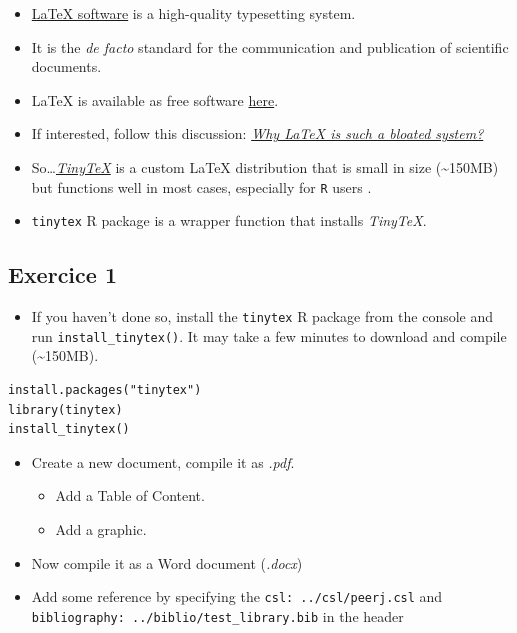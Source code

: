\documentclass[]{article}
\providecommand{\tightlist}{%
  \setlength{\itemsep}{0pt}\setlength{\parskip}{0pt}}
\begin{document}
\begin{itemize}
\item
  \href{https://www.latex-project.org}{LaTeX software} is a high-quality
  typesetting system.
\item
  It is the \emph{de facto} standard for the communication and
  publication of scientific documents.
\item
  LaTeX is available as free software
  \href{https://www.latex-project.org/get/}{here}.
\item
  If interested, follow this discussion:
  \href{https://ubuntuforums.org/showthread.php?t=395863}{\emph{Why
  LaTeX is such a bloated system?}}
\item
  So\ldots{}\href{https://yihui.name/tinytex/r/}{\emph{TinyTeX}} is a
  custom LaTeX distribution that is small in size
  (\textasciitilde{}150MB) but functions well in most cases, especially
  for \texttt{R} users .
\item
  \texttt{tinytex} R package is a wrapper function that installs
  \emph{TinyTeX}.
\end{itemize}

\hypertarget{exercice-1}{%
\subsection{Exercice 1}\label{exercice-1}}

\begin{itemize}
\tightlist
\item
  If you haven't done so, install the \texttt{tinytex} R package from
  the console and run \texttt{install\_tinytex()}. It may take a few
  minutes to download and compile (\textasciitilde{}150MB).
\end{itemize}

\begin{verbatim}
install.packages("tinytex")  
library(tinytex)  
install_tinytex()  
\end{verbatim}

\begin{itemize}
\item
  Create a new document, compile it as \emph{.pdf}.

  \begin{itemize}
  \tightlist
  \item
    Add a Table of Content.
  \item
    Add a graphic.
  \end{itemize}
\item
  Now compile it as a Word document (\emph{.docx})
\item
  Add some reference by specifying the \texttt{csl:\ ../csl/peerj.csl}
  and \texttt{bibliography:\ ../biblio/test\_library.bib} in the header
\end{itemize}
\end{document}
